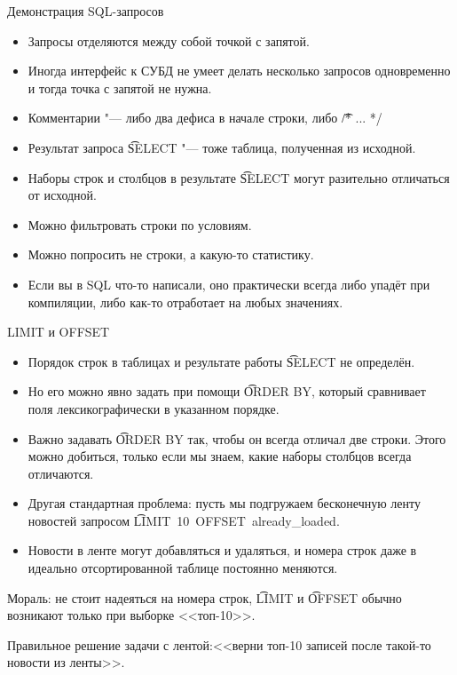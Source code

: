\begin{frame}{Демонстрация SQL-запросов}
	\begin{itemize}
		\item Запросы отделяются между собой точкой с запятой.
		\item Иногда интерфейс к СУБД не умеет делать несколько запросов одновременно и тогда точка с запятой не нужна.
		\item Комментарии "--- либо два дефиса в начале строки, либо \t{/* ... */}
		\item Результат запроса \t{SELECT} "--- тоже таблица, полученная из исходной.
		\item Наборы строк и столбцов в результате \t{SELECT} могут разительно отличаться от исходной.
		\item Можно фильтровать строки по условиям.
		\item Можно попросить не строки, а какую-то статистику.
		\item Если вы в SQL что-то написали, оно практически всегда либо упадёт при компиляции, либо как-то отработает на любых значениях.
	\end{itemize}
\end{frame}

\begin{frame}[t]{LIMIT и OFFSET}
	\begin{itemize}
		\item Порядок строк в таблицах и результате работы \t{SELECT} не определён.
		\item Но его можно явно задать при помощи \t{ORDER BY}, который сравнивает поля лексикографически в указанном порядке.
		\item
			Важно задавать \t{ORDER BY} так, чтобы он всегда отличал две строки.
			Этого можно добиться, только если мы знаем, какие наборы столбцов всегда отличаются.
		\item
			Другая стандартная проблема: пусть мы подгружаем бесконечную ленту новостей
			запросом \t{LIMIT~10~OFFSET~already\_loaded}.
			\pause
		\item
			Новости в ленте могут добавляться и удаляться, и номера строк даже в идеально отсортированной таблице
			постоянно меняются.
	\end{itemize}
	Мораль: не стоит надеяться на номера строк, \t{LIMIT} и \t{OFFSET} обычно возникают только при выборке <<топ-10>>.

	Правильное решение задачи с лентой:\pause <<верни топ-10 записей после такой-то новости из ленты>>.
\end{frame}

